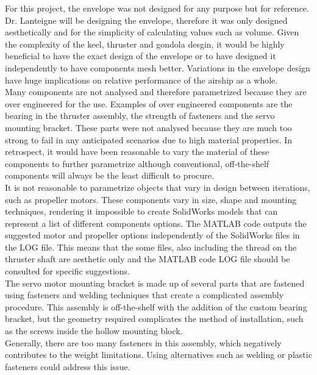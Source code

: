 \documentclass[../main.tex]{subfiles}
\begin{document}
For this project, the envelope was not designed for any purpose but for reference. Dr. Lanteigne will be designing the envelope, therefore it was only designed aesthetically and for the simplicity of calculating values such as volume. Given the complexity of the keel, thruster and gondola desgin, it would be highly beneficial to have the exact design of the envelope or to have designed it independently to have components mesh better. Variations in the envelope design have huge implications on relative performance of the airship as a whole.\\

Many components are not analysed and therefore parametrized because they are over engineered for the use. Examples of over engineered components are the bearing in the thruster assembly, the strength of fasteners and the servo mounting bracket. These parts were not analysed because they are much too strong to fail in any anticipated scenarios due to high material properties. In retrospect, it would have been reasonable to vary the material of these components to further parametrize although conventional, off-the-shelf components will always be the least difficult to procure.\\

It is not reasonable to parametrize objects that vary in design between iterations, such as propeller motors. These components vary in size, shape and mounting techniques, rendering it impossible to create SolidWorks models that can represent a list of different components options. The MATLAB code outputs the suggested motor and propeller options independently of the SolidWorks files in the LOG file. This means that the some files, also including the thread on the thruster shaft are aesthetic only and the MATLAB code LOG file should be consulted for specific suggestions.\\

The servo motor mounting bracket is made up of several parts that are fastened using fasteners and welding techniques that create a complicated assembly procedure. This assembly is off-the-shelf with the addition of the custom bearing bracket, but the geometry required complicates the method of installation, such as the screws inside the hollow mounting block.\\

Generally, there are too many fasteners in this assembly, which negatively contributes to the weight limitations. Using alternatives such as welding or plastic fasteners could address this issue. \\
\end{document}
